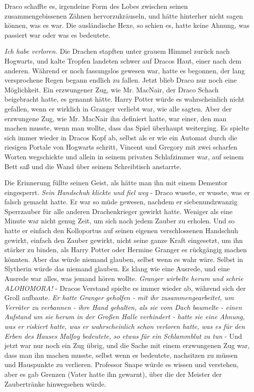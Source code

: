 Draco schaffte es, irgendeine Form des Lobes zwischen seinen zusammengebissenen
Zähnen hervorzukräuseln, und hätte hinterher nicht sagen können, was es war. Die
ausländische Hexe, so schien es, hatte keine Ahnung, was passiert war oder was
es bedeutete.

\emph{Ich habe verloren.} Die Drachen stapften unter grauem Himmel zurück nach
Hogwarts, und kalte Tropfen landeten schwer auf Dracos Haut, einer nach dem
anderen. Während er noch fassungslos gewesen war, hatte es begonnen, der lang
versprochene Regen begann endlich zu fallen. Jetzt blieb Draco nur noch eine
Möglichkeit. Ein erzwungener Zug, wie Mr. MacNair, der Draco Schach beigebracht
hatte, es genannt hätte. Harry Potter würde es wahrscheinlich nicht gefallen,
wenn er wirklich in Granger verliebt war, wie alle sagten. Aber der erzwungene
Zug, wie Mr. MacNair ihn definiert hatte, war einer, den man machen musste, wenn
man wollte, dass das Spiel überhaupt weiterging. Es spielte sich immer wieder in
Dracos Kopf ab, selbst als er wie ein Automat durch die riesigen Portale von
Hogwarts schritt, Vincent und Gregory mit zwei scharfen Worten wegschickte und
allein in seinem privaten Schlafzimmer war, auf seinem Bett saß und die Wand
über seinem Schreibtisch anstarrte.

Die Erinnerung füllte seinen Geist, als hätte man ihn mit einem Dementor
eingesperrt. \emph{Sein Handschuh klickte und fiel weg} - Draco wusste, er
wusste, was er falsch gemacht hatte. Er war so müde gewesen, nachdem er
siebenundzwanzig Sperrzauber für alle anderen Drachenkrieger gewirkt hatte.
Weniger als eine Minute war nicht genug Zeit, um sich nach jedem Zauber zu
erholen. Und so hatte er einfach den Kolloportus auf seinen eigenen
verschlossenen Handschuh gewirkt, einfach den Zauber gewirkt, nicht seine ganze
Kraft eingesetzt, um ihn stärker zu binden, als Harry Potter oder Hermine
Granger es rückgängig machen könnten. Aber das würde niemand glauben, selbst
wenn es wahr wäre. Selbst in Slytherin würde das niemand glauben. Es klang wie
eine Ausrede, und eine Ausrede war alles, was jemand hören wollte. \emph{Granger
wirbelte herum und schrie \glqq{}ALOHOMORA!\grqq{}} - Dracos Verstand spielte es
immer wieder ab, während sich der Groll aufbaute. \emph{Er hatte Granger
geholfen - mit ihr zusammengearbeitet, um Verräter zu verbannen - ihre Hand
gehalten, als sie vom Dach baumelte - einen Aufstand um sie herum in der Großen
Halle verhindert - hatte sie eine Ahnung, was er riskiert hatte, was er
wahrscheinlich schon verloren hatte, was es für den Erben des Hauses Malfoy
bedeutete, so etwas} \emph{für ein Schlammblut zu tun} - Und jetzt war nur noch
ein Zug übrig, und die Sache mit einem erzwungenen Zug war, dass man ihn machen
musste, selbst wenn es bedeutete, nachsitzen zu müssen und Hauspunkte zu
verlieren. Professor Snape würde es wissen und verstehen, aber es gab Grenzen
(Vater hatte ihn gewarnt), über die der Meister der Zaubertränke hinwegsehen
würde.


